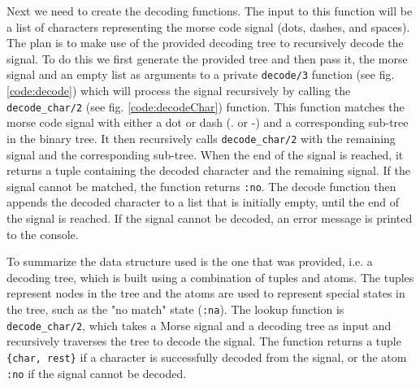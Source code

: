 \documentclass[a4paper,11pt]{article}
\begin{document}
Next we need to create the decoding functions. The input to this function will be a list of characters representing the morse code 
signal (dots, dashes, and spaces). The plan is to make use of the provided decoding tree to recursively decode the signal. To do this 
we first generate the provided tree and then pass it, the morse signal and an empty list as arguments to a private 
{\tt decode/3} function (see fig. \ref{code:decode}) which will process the signal recursively by calling the {\tt decode\_char/2} 
(see fig. \ref{code:decodeChar}) function. This function 
matches the morse code signal with either a dot or dash (. or -) and a corresponding sub-tree in the binary tree. It then 
recursively calls {\tt decode\_char/2} with the remaining signal and the corresponding sub-tree. When the end of the signal is reached,
it returns a tuple containing the decoded character and the remaining signal. If the signal cannot be matched, the function returns 
{\tt :no}.
The decode function then appends the decoded character to a list that is initially empty, until the end of the signal is reached. 
If the signal cannot be decoded, an error message is printed to the console.

To summarize the data structure used is the one that was provided, i.e. a decoding tree, which is built using a combination of tuples 
and atoms. The tuples represent nodes in the tree and the atoms are used to represent special states in the tree, such as the "no match" 
state ({\tt :na}). The lookup function is {\tt decode\_char/2}, which takes a Morse signal and a decoding tree as input and recursively 
traverses the tree to decode the signal. The function returns a tuple {\tt\{char, rest\}} if a character is successfully decoded from the 
signal, or the atom {\tt:no} if the signal cannot be decoded.
\end{document}
